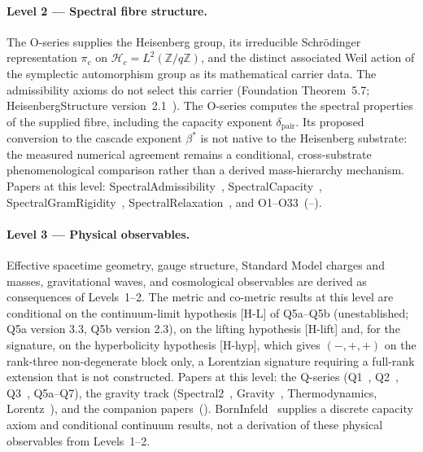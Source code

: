 \documentclass[11pt,a4paper]{article}
\begin{document}
  \paragraph{Level 2 --- Spectral fibre structure.}
    The O-series supplies the Heisenberg group, its irreducible Schr\"odinger representation
    $\pi_c$ on $\mathcal{H}_c=L^2(\mathbb{Z}/q\mathbb{Z})$, and the distinct associated Weil
    action of the symplectic automorphism group as its mathematical carrier data.
    The admissibility axioms do not select this carrier (Foundation Theorem~5.7;
    HeisenbergStructure version~2.1~\cite{Beau2026HeisenbergStructure}).
    The O-series computes the spectral properties of the supplied fibre, including the capacity exponent
    $\delta_{\mathrm{pair}}$.
    Its proposed conversion to the cascade exponent $\beta^*$ is not native to the Heisenberg
    substrate: the measured numerical agreement remains a conditional, cross-substrate
    phenomenological comparison rather than a derived mass-hierarchy mechanism.
    Papers at this level: SpectralAdmissibility~\cite{Beau2026a1},
    SpectralCapacity~\cite{Beau2026a2},
    SpectralGramRigidity~\cite{Beau2026a3}, SpectralRelaxation~\cite{Beau2026a5},
    and O1--O33~(\cite{Beau2026a6}--\cite{Beau2026a37}).

  \paragraph{Level 3 --- Physical observables.}
    Effective spacetime geometry, gauge structure, Standard Model charges and masses, gravitational
    waves, and cosmological observables are derived as consequences of Levels~1--2.
    The metric and co-metric results at this level are conditional on the continuum-limit hypothesis [H-L] of Q5a--Q5b
    (unestablished; Q5a version 3.3, Q5b version 2.3), on the lifting hypothesis [H-lift] and, for the signature,
    on the hyperbolicity hypothesis [H-hyp], which gives $(-,+,+)$ on the rank-three non-degenerate block only, a
    Lorentzian signature requiring a full-rank extension that is not constructed.
    Papers at this level: the Q-series (Q1~\cite{Beau2026q1}, Q2~\cite{Beau2026q2},
    Q3~\cite{Beau2026q3}, Q5a--Q7), the gravity track
    (Spectral2~\cite{Beau2026a}, Gravity~\cite{Beau2026h}, Thermodynamics, Lorentz~\cite{Beau2026i}),
    and the companion papers~(\cite{Beau2026b,Beau2026d,Beau2026e,Beau2026f,Beau2026g,Beau2026k}).
    BornInfeld~\cite{Beau2026c} supplies a discrete capacity axiom and conditional continuum results,
    not a derivation of these physical observables from Levels~1--2.
\end{document}
